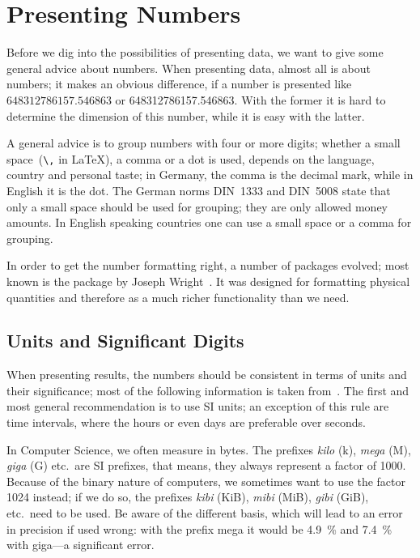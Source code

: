 \section{Presenting Numbers}

Before we dig into the possibilities of presenting data, we want to give some
general advice about numbers.  When presenting data, almost all is about
numbers; it makes an obvious difference, if a number is presented like
$648312786157.546863$ or \num{648312786157.546863}.  With the former it is hard
to determine the dimension of this number, while it is easy with the latter.

A general advice is to group numbers with four or more digits; whether a small
space~(\verb!\,! in \LaTeX), a comma or a dot is used, depends on the language,
country and personal taste; in Germany, the comma is the decimal mark, while in
English it is the dot.  The German norms DIN~1333 and DIN~5008 state that only a
small space should be used for grouping; they are only allowed money amounts.
In English speaking countries one can use a small space or a comma for grouping.

In order to get the number formatting right, a number of packages evolved; most
known is the  package by Joseph Wright~\cite{Wright2016}.  It
was designed for formatting physical quantities and therefore as a much richer
functionality than we need.

\subsection{Units and Significant Digits}

When presenting results, the numbers should be consistent in terms of units and
their significance; most of the following information is taken
from~\cite{BeyerLoeweWendler2016}.  The first and most general recommendation is
to use SI units; an exception of this rule are time intervals, where the hours
or even days are preferable over seconds.

In Computer Science, we often measure in bytes.  The prefixes \emph{kilo} (k),
\emph{mega} (M), \emph{giga} (G) etc.\ are SI prefixes, that means, they always
represent a factor of \num{1000}.  Because of the binary nature of computers, we
sometimes want to use the factor \num{1024} instead; if we do so, the prefixes
\emph{kibi} (KiB), \emph{mibi} (MiB), \emph{gibi} (GiB), etc.\ need to be used.
Be aware of the different basis, which will lead to an error in precision if
used wrong: with the prefix mega it would be \SI{4.9}{\percent} and
\SI{7.4}{\percent} with giga—a significant error.
